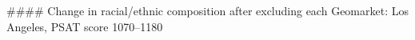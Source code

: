#### Change in racial/ethnic composition after excluding each Geomarket: Los Angeles, PSAT score 1070–1180
